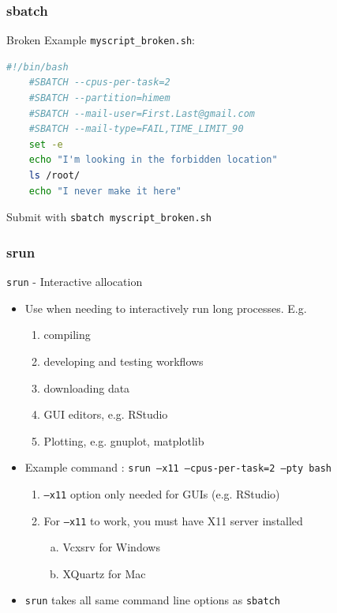 \documentclass{beamer}
\newcommand{\code}[1]{\colorbox{codegray}{\texttt{#1}}}
\begin{document}
\begin{frame}[fragile]
\frametitle{sbatch}
Broken Example \code{myscript\_broken.sh}: 
\begin{lstlisting}[backgroundcolor = \color{codegray}, language = Bash,showstringspaces=false]
    #!/bin/bash
    #SBATCH --cpus-per-task=2
    #SBATCH --partition=himem
    #SBATCH --mail-user=First.Last@gmail.com
    #SBATCH --mail-type=FAIL,TIME_LIMIT_90
    set -e
    echo "I'm looking in the forbidden location"
    ls /root/
    echo "I never make it here"
\end{lstlisting}
\bigskip
\bigskip
Submit with \code{sbatch myscript\_broken.sh}
\end{frame}



\begin{frame}
\frametitle{srun}
\code{srun} - Interactive allocation 
\bigskip
\begin{itemize}
    \item Use when needing to interactively run long processes. E.g.
        \begin{enumerate}
            \item compiling
            \pause 
            \item developing and testing workflows
            \pause 
            \item downloading data
            \pause 
            \item GUI editors, e.g. RStudio
            \pause 
            \item Plotting, e.g. gnuplot, matplotlib
            \pause 
        \end{enumerate}
    \pause
    \item Example command : \code{srun --x11 --cpus-per-task=2 --pty bash}
        \pause
        \begin{enumerate}
            \item \code{--x11} option only needed for GUIs (e.g. RStudio)
            \pause
            \item For \code{--x11} to work, you must have X11 server installed
            \pause
            \begin{enumerate}[a)]
                \item Vcxsrv for Windows
                \pause
                \item XQuartz for Mac
            \end{enumerate}
        \end{enumerate}
    \pause
    \item \code{srun} takes all same command line options as \code{sbatch}
\end{itemize}
\end{frame}
\end{document}
